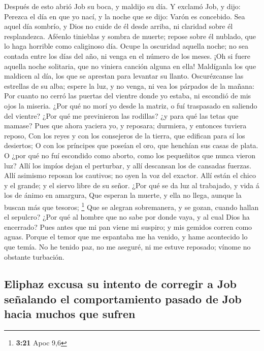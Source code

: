  Después de esto abrió Job su boca, y maldijo su día.
 Y exclamó Job, y dijo:  Perezca el día en que
yo nací, y la noche que se dijo: Varón es concebido.  Sea
aquel día sombrío, y Dios no cuide de él desde arriba, ni claridad sobre
él resplandezca.  Aféenlo tinieblas y sombra de muerte;
repose sobre él nublado, que lo haga horrible como caliginoso día.
 Ocupe la oscuridad aquella noche; no sea contada entre los
días del año, ni venga en el número de los meses.  ¡Oh si
fuere aquella noche solitaria, que no viniera canción alguna en ella!
 Maldíganla los que maldicen al día, los que se aprestan
para levantar su llanto.  Oscurézcanse las estrellas de su
alba; espere la luz, y no venga, ni vea los párpados de la mañana:
 Por cuanto no cerró las puertas del vientre donde yo
estaba, ni escondió de mis ojos la miseria.  ¿Por qué no
morí yo desde la matriz, o fuí traspasado en saliendo del vientre?
 ¿Por qué me previnieron las rodillas? ¿y para qué las
tetas que mamase?  Pues que ahora yaciera yo, y reposara;
durmiera, y entonces tuviera reposo,  Con los reyes y con
los consejeros de la tierra, que edifican para sí los desiertos;
 O con los príncipes que poseían el oro, que henchían sus
casas de plata.  O ¿por qué no fuí escondido como aborto,
como los pequeñitos que nunca vieron luz?  Allí los impíos
dejan el perturbar, y allí descansan los de cansadas fuerzas.
 Allí asimismo reposan los cautivos; no oyen la voz del
exactor.  Allí están el chico y el grande; y el siervo
libre de su señor.  ¿Por qué se da luz al trabajado, y vida
á los de ánimo en amargura,  Que esperan la muerte, y ella
no llega, aunque la buscan más que tesoros; \footnote{\textbf{3:21} Apoc
  9,6}  Que se alegran sobremanera, y se gozan, cuando
hallan el sepulcro?  ¿Por qué al hombre que no sabe por
donde vaya, y al cual Dios ha encerrado?  Pues antes que mi
pan viene mi suspiro; y mis gemidos corren como aguas. 
Porque el temor que me espantaba me ha venido, y hame acontecido lo que
temía.  No he tenido paz, no me aseguré, ni me estuve
reposado; vínome no obstante turbación.

\hypertarget{eliphaz-excusa-su-intento-de-corregir-a-job-seuxf1alando-el-comportamiento-pasado-de-job-hacia-muchos-que-sufren}{%
\subsection{Eliphaz excusa su intento de corregir a Job señalando el
comportamiento pasado de Job hacia muchos que
sufren}\label{eliphaz-excusa-su-intento-de-corregir-a-job-seuxf1alando-el-comportamiento-pasado-de-job-hacia-muchos-que-sufren}}


